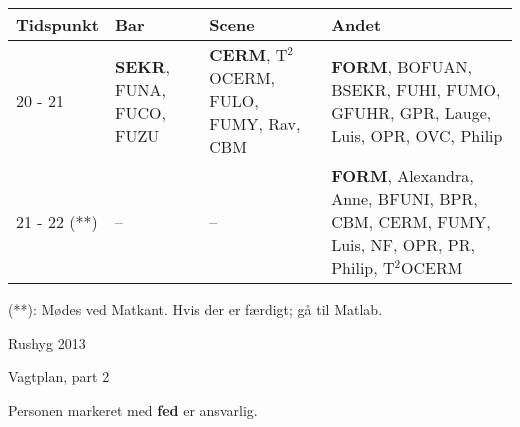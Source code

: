 \documentclass[danish,a4paper,11pt,oneside,article]{memoir}
\begin{document}
\begin{table}[h!]
  \centering
  \hspace*{-1.1cm}\begin{tabular}{l|p{5.5cm}p{5.0cm}p{12.2cm}}
    \toprule
    \textbf{Tidspunkt} & \textbf{Bar} & \textbf{Scene} &
    \textbf{Andet} \\
    \midrule
    20 - 21 & \textbf{SEKR}, FUNA, FUCO, FUZU & \textbf{CERM}, T$^2$OCERM,
    FULO, FUMY, Rav, CBM & \textbf{FORM},
    BOFUAN,
    BSEKR,
    FUHI,
    FUMO,
    GFUHR,
    GPR,
    Lauge,
    Luis,
    OPR,
    OVC,
    Philip
    \\
    21 - 22 (**) & -- & -- & \textbf{FORM},
    Alexandra,
    Anne,
    BFUNI,
    BPR,
    CBM,
    CERM,
    FUMY,
    Luis,
    NF,
    OPR,
    PR,
    Philip,
    T$^2$OCERM
    \\
    \bottomrule
  \end{tabular}
\end{table}

\noindent (**): Mødes ved Matkant. Hvis der er færdigt; gå til Matlab.
\newpage


\begin{center}
  \noindent \huge Rushyg 2013 \normalsize
\end{center}

\bigskip

\noindent \LARGE Vagtplan, part 2 \normalsize

\medskip

\noindent Personen markeret med \textbf{fed} er ansvarlig.

\bigskip
\end{document}
